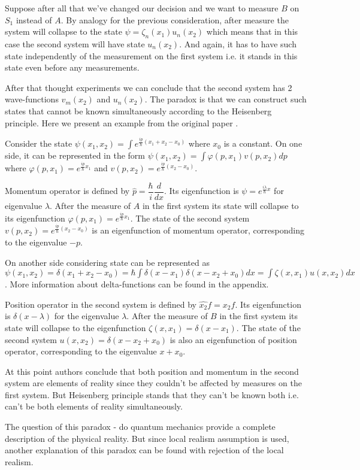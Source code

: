 \documentclass[11pt]{article}
\begin{document}
Suppose after all that we've changed our decision and we want to measure $B$ on $S_1$ instead of $A$. By analogy for the previous consideration, after measure the system will collapse to the state $\psi = \zeta_n(x_1)u_n(x_2)$ which means that in this case the second system will have state $u_n(x_2)$. And again, it has to have such state independently of the measurement on the first system i.e. it stands in this state even before any measurements.

After that thought experiments we can conclude that the second system has 2 wave-functions $v_m(x_2)$ and $u_n(x_2)$. The paradox is that we can construct such states that cannot be known simultaneously according to the Heisenberg principle. Here we present an example from the original paper \cite{EPR}.

Consider the state $\psi(x_1, x_2) = \int e^{\frac{ip}{\hbar}(x_1+x_2-x_0)}$ where $x_0$ is a constant. On one side, it can be represented in the form $\psi(x_1, x_2) = \int\varphi(p, x_1)v(p, x_2)dp$ where $\varphi(p, x_1) = e^{\frac{ip}{\hbar}x_1}$ and $v(p, x_2) = e^{\frac{ip}{\hbar}(x_2-x_0)}$. 

Momentum operator is defined by $\hat{p} = \dfrac{\hbar}{i}\dfrac{d}{dx}$. Its eigenfunction is $\psi = e^{\frac{i\lambda}{\hbar}x}$ for eigenvalue $\lambda$. After the measure of $A$ in the first system its state will collapse to its eigenfunction $\varphi(p, x_1) = e^{\frac{ip}{\hbar}x_1}$. The state of the second system $v(p, x_2) = e^{\frac{ip}{\hbar}(x_2-x_0)}$ is an eigenfunction of momentum operator, corresponding to the eigenvalue $-p$. 

On another side considering state can be represented as $\psi(x_1, x_2) = \delta(x_1 + x_2 - x_0) = \hbar\int\delta(x - x_1)\delta (x - x_2 + x_0)dx = \int\zeta(x, x_1)u(x, x_2)dx$. More information about delta-functions can be found in the appendix.

Position operator in the second system is defined by $\hat{x_2}f = x_2f$. Its eigenfunction is $\delta(x - \lambda)$ for the eigenvalue $\lambda$. After the measure of $B$ in the first system its state will collapse to the eigenfunction $\zeta(x, x_1) = \delta(x - x_1)$. The state of the second system $u(x, x_2) = \delta(x - x_2 + x_0)$ is also an eigenfunction of position operator, corresponding to the eigenvalue $x + x_0$.

At this point authors conclude that both position and momentum in the second system are elements of reality since they couldn't be affected by measures on the first system. But Heisenberg principle stands that they can't be known both i.e. can't be both elements of reality simultaneously. 

The question of this paradox - do quantum mechanics provide a complete description of the physical reality. But since local realism assumption is used, another explanation of this paradox can be found with rejection of the local realism.



\end{document}
